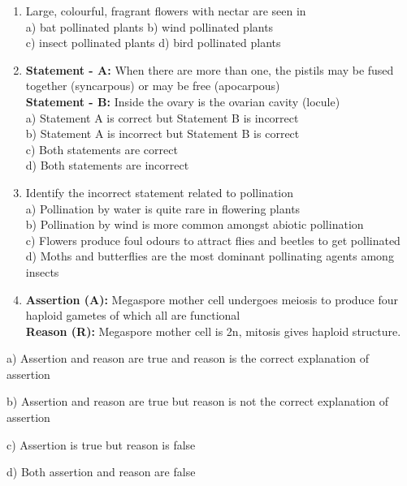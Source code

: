 \begin{enumerate}
\def\labelenumi{\arabic{enumi}.}
\setcounter{enumi}{143}
\item
  Large, colourful, fragrant flowers with nectar are seen in\\
  a) bat pollinated plants b) wind pollinated plants\\
  c) insect pollinated plants d) bird pollinated plants
\item
  \textbf{Statement - A:} When there are more than one, the pistils may
  be fused together (syncarpous) or may be free (apocarpous)\\
  \textbf{Statement - B:} Inside the ovary is the ovarian cavity
  (locule)\\
  a) Statement A is correct but Statement B is incorrect\\
  b) Statement A is incorrect but Statement B is correct\\
  c) Both statements are correct\\
  d) Both statements are incorrect
\item
  Identify the incorrect statement related to pollination\\
  a) Pollination by water is quite rare in flowering plants\\
  b) Pollination by wind is more common amongst abiotic pollination\\
  c) Flowers produce foul odours to attract flies and beetles to get
  pollinated\\
  d) Moths and butterflies are the most dominant pollinating agents
  among insects
\item
  \textbf{Assertion (A):} Megaspore mother cell undergoes meiosis to
  produce four haploid gametes of which all are functional\\
  \textbf{Reason (R):} Megaspore mother cell is 2n, mitosis gives
  haploid structure.
\end{enumerate}

a) Assertion and reason are true and reason is the correct explanation
of assertion

b) Assertion and reason are true but reason is not the correct
explanation of assertion

c) Assertion is true but reason is false

d) Both assertion and reason are false

